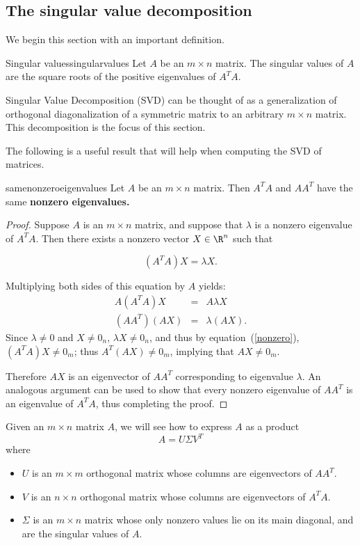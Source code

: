 \subsection{The singular value decomposition}

We begin this section with an important definition.

\begin{definition}{Singular values}{singularvalues}
Let $A$ be an $m\times n$ matrix. The singular values of $A$ are the square roots of the positive
eigenvalues of $A^TA$.
\end{definition}

Singular Value Decomposition (SVD) can be thought of as 
a generalization of orthogonal diagonalization of a symmetric matrix
to an arbitrary $m\times n$ matrix. This decomposition is the focus of this section. 

The following is a useful result that will help when computing the SVD of matrices.

\begin{proposition}{}{samenonzeroeigenvalues}
Let $A$ be an $m \times n$ matrix. Then $A^TA$ and $AA^T$ have the same \bf{nonzero} eigenvalues.
\end{proposition}

\begin{proof}
Suppose $A$ is an $m\times n$ matrix, and suppose that  $\lambda$ is a nonzero eigenvalue of $A^TA$.
Then there exists a nonzero vector $X\in \R^n$ such that

\begin{equation}\label{nonzero}
(A^TA)X=\lambda X.
\end{equation}

Multiplying both sides of this equation by $A$ yields:
\begin{eqnarray*}
A(A^TA)X & = & A\lambda X\\
(AA^T)(AX) & = & \lambda (AX).
\end{eqnarray*}
Since $\lambda\neq 0$ and $X\neq 0_n$, $\lambda X\neq 0_n$,
and thus by equation~(\ref{nonzero}),
$(A^TA)X\neq 0_m$; thus $A^T(AX)\neq 0_m$, 
implying that $AX\neq 0_m$.

Therefore $AX$ is an eigenvector of $AA^T$ corresponding to eigenvalue
$\lambda$.  An analogous argument can be used to show that every
nonzero eigenvalue of $AA^T$ is an eigenvalue of $A^TA$, thus
completing the proof.
\end{proof}

Given an $m\times n$ matrix $A$, we will see how to express $A$ as a product
\[ A=U\Sigma V^T\]
where
\begin{itemize}
\item $U$ is an $m\times m$ orthogonal matrix whose columns are
eigenvectors of $AA^T$.
\item $V$ is an $n\times n$ orthogonal matrix whose columns are
eigenvectors of $A^TA$.
\item $\Sigma$ is an $m\times n$ matrix whose only nonzero values
lie on its main diagonal, and are the singular values of $A$.
\end{itemize}

